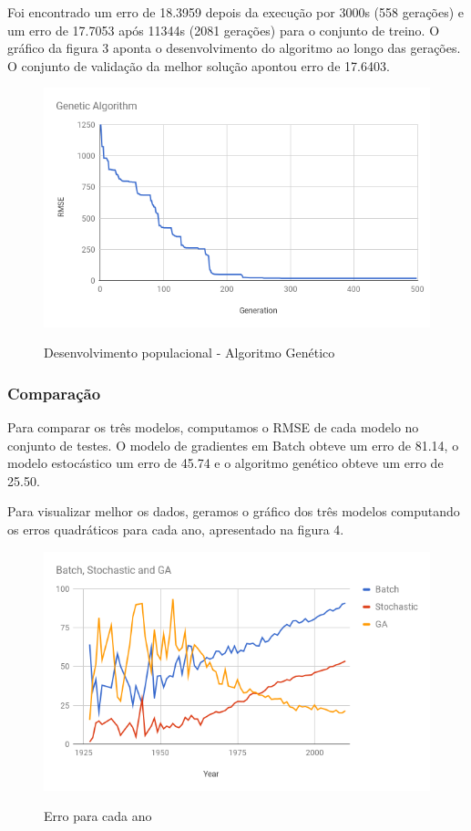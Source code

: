 \documentclass[conference]{IEEEtran}
\begin{document}
Foi encontrado um erro de 18.3959 depois da execução por 3000s (558 gerações) e um erro de 17.7053 após 11344s (2081 gerações) para o conjunto de treino. O gráfico da figura 3 aponta o desenvolvimento do algoritmo ao longo das gerações. O conjunto de validação da melhor solução apontou erro de 17.6403. 

\begin{figure}[h!]
	\includegraphics[scale=0.4]{ga.png}
	\label{fig:ga}
	\caption{Desenvolvimento populacional - Algoritmo Genético}
\end{figure}

\subsubsection{Comparação}
Para comparar os três modelos, computamos o RMSE de cada modelo no conjunto de testes. O modelo de gradientes em Batch obteve um erro de 81.14, o modelo estocástico um erro de 45.74 e o algoritmo genético obteve um erro de 25.50. 

Para visualizar melhor os dados, geramos o gráfico dos três modelos computando os erros quadráticos para cada ano, apresentado na figura 4.

\begin{figure}[h!]
	\includegraphics[scale=0.4]{lr_errors.png}
	\label{fig:ga}
	\caption{Erro para cada ano}
\end{figure}
\end{document}
